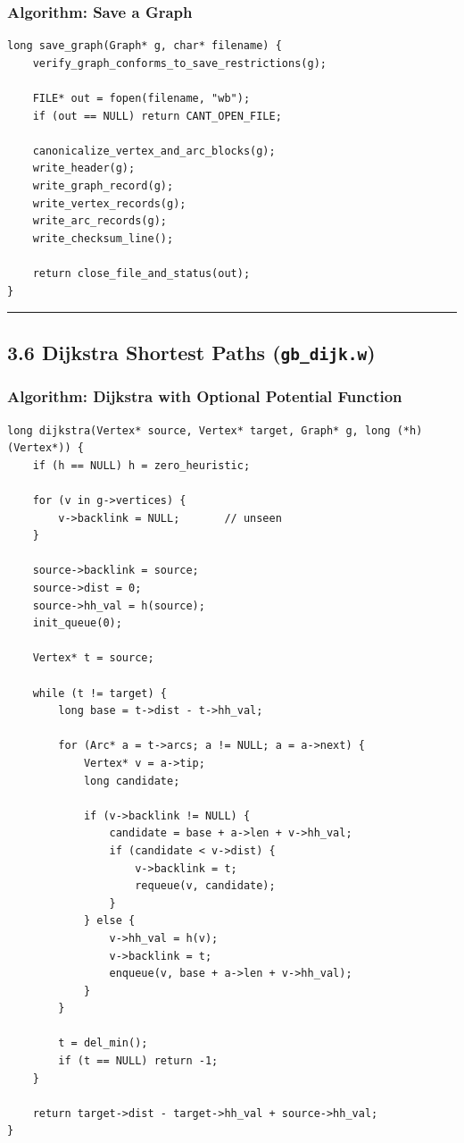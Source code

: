 \documentclass[11pt]{article}
\begin{document}
\subsubsection{Algorithm: Save a Graph}\label{algorithm-save-a-graph}

\begin{verbatim}
long save_graph(Graph* g, char* filename) {
    verify_graph_conforms_to_save_restrictions(g);

    FILE* out = fopen(filename, "wb");
    if (out == NULL) return CANT_OPEN_FILE;

    canonicalize_vertex_and_arc_blocks(g);
    write_header(g);
    write_graph_record(g);
    write_vertex_records(g);
    write_arc_records(g);
    write_checksum_line();

    return close_file_and_status(out);
}
\end{verbatim}

\begin{center}\rule{0.5\linewidth}{0.5pt}\end{center}

\subsection{\texorpdfstring{3.6 Dijkstra Shortest Paths (\texttt{gb\_dijk.w})}{3.6 Dijkstra Shortest Paths (gb\_dijk.w)}}\label{dijkstra-shortest-paths-gb_dijk.w}

\subsubsection{Algorithm: Dijkstra with Optional Potential Function}\label{algorithm-dijkstra-with-optional-potential-function}

\begin{verbatim}
long dijkstra(Vertex* source, Vertex* target, Graph* g, long (*h)(Vertex*)) {
    if (h == NULL) h = zero_heuristic;

    for (v in g->vertices) {
        v->backlink = NULL;       // unseen
    }

    source->backlink = source;
    source->dist = 0;
    source->hh_val = h(source);
    init_queue(0);

    Vertex* t = source;

    while (t != target) {
        long base = t->dist - t->hh_val;

        for (Arc* a = t->arcs; a != NULL; a = a->next) {
            Vertex* v = a->tip;
            long candidate;

            if (v->backlink != NULL) {
                candidate = base + a->len + v->hh_val;
                if (candidate < v->dist) {
                    v->backlink = t;
                    requeue(v, candidate);
                }
            } else {
                v->hh_val = h(v);
                v->backlink = t;
                enqueue(v, base + a->len + v->hh_val);
            }
        }

        t = del_min();
        if (t == NULL) return -1;
    }

    return target->dist - target->hh_val + source->hh_val;
}
\end{verbatim}
\end{document}
